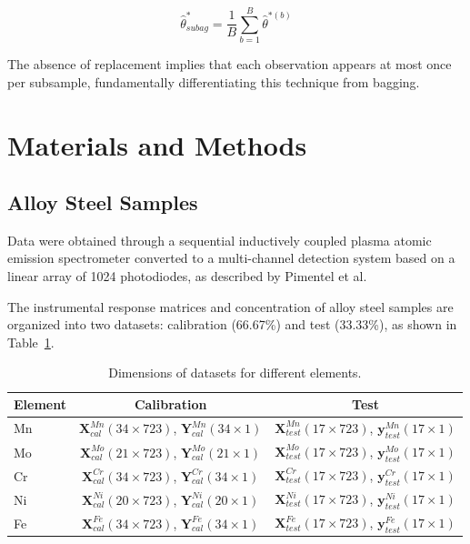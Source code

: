 \documentclass[12pt]{article}
\begin{document}
\begin{equation}
\hat{\theta}^*_{subag} = \frac{1}{B}\sum_{b=1}^{B}\hat{\theta}^{*(b)}
\end{equation}

The absence of replacement implies that each observation appears at most once per subsample, fundamentally differentiating this technique from bagging.\cite{revelas2024, qin2023, GALVAO:2006}

\section{Materials and Methods}

\subsection{Alloy Steel Samples}

Data were obtained through a sequential inductively coupled plasma atomic emission spectrometer converted to a multi-channel detection system based on a linear array of 1024 photodiodes, as described by Pimentel et al.\cite{GALVAO:2006}

The instrumental response matrices and concentration of alloy steel samples are organized into two datasets: calibration (66.67\%) and test (33.33\%), as shown in Table~\ref{tab:dimensions}.

\begin{table}[H]
\centering
\caption{Dimensions of datasets for different elements.}
\label{tab:dimensions}
\begin{tabular}{lcc}
\toprule
Element & Calibration & Test \\
\midrule
Mn & $\mathbf{X}_{cal}^{Mn}(34\times723)$, $\mathbf{Y}_{cal}^{Mn}(34\times1)$ & $\mathbf{X}_{test}^{Mn}(17\times723)$, $\mathbf{y}_{test}^{Mn}(17\times1)$ \\
Mo & $\mathbf{X}_{cal}^{Mo}(21\times723)$, $\mathbf{Y}_{cal}^{Mo}(21\times1)$ & $\mathbf{X}_{test}^{Mo}(17\times723)$, $\mathbf{y}_{test}^{Mo}(17\times1)$ \\
Cr & $\mathbf{X}_{cal}^{Cr}(34\times723)$, $\mathbf{Y}_{cal}^{Cr}(34\times1)$ & $\mathbf{X}_{test}^{Cr}(17\times723)$, $\mathbf{y}_{test}^{Cr}(17\times1)$ \\
Ni & $\mathbf{X}_{cal}^{Ni}(20\times723)$, $\mathbf{Y}_{cal}^{Ni}(20\times1)$ & $\mathbf{X}_{test}^{Ni}(17\times723)$, $\mathbf{y}_{test}^{Ni}(17\times1)$ \\
Fe & $\mathbf{X}_{cal}^{Fe}(34\times723)$, $\mathbf{Y}_{cal}^{Fe}(34\times1)$ & $\mathbf{X}_{test}^{Fe}(17\times723)$, $\mathbf{y}_{test}^{Fe}(17\times1)$ \\
\bottomrule
\end{tabular}
\end{table}
\end{document}
